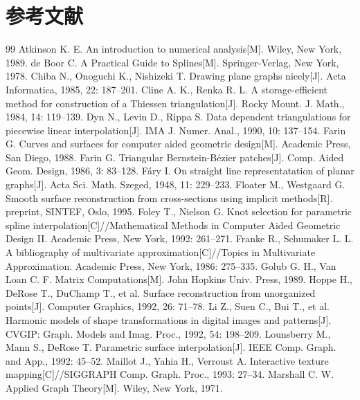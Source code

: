 \documentclass{ctexart}
\theoremstyle{proof}
\begin{document}
\section{参考文献}
\begin{thebibliography}{99}
     Atkinson K. E. An introduction to numerical analysis[M]. Wiley, New York, 1989.
     de Boor C. A Practical Guide to Splines[M]. Springer-Verlag, New York, 1978.
     Chiba N., Onoguchi K., Nishizeki T. Drawing plane graphs nicely[J]. Acta Informatica, 1985, 22: 187–201.
     Cline A. K., Renka R. L. A storage-efficient method for construction of a Thiessen triangulation[J]. Rocky Mount. J. Math., 1984, 14: 119–139.
     Dyn N., Levin D., Rippa S. Data dependent triangulations for piecewise linear interpolation[J]. IMA J. Numer. Anal., 1990, 10: 137–154.
     Farin G. Curves and surfaces for computer aided geometric design[M]. Academic Press, San Diego, 1988.
     Farin G. Triangular Bernstein-Bézier patches[J]. Comp. Aided Geom. Design, 1986, 3: 83–128.
     Fáry I. On straight line representatation of planar graphs[J]. Acta Sci. Math. Szeged, 1948, 11: 229–233.
     Floater M., Westgaard G. Smooth surface reconstruction from cross-sections using implicit methods[R]. preprint, SINTEF, Oslo, 1995.
     Foley T., Nielson G. Knot selection for parametric spline interpolation[C]//Mathematical Methods in Computer Aided Geometric Design II. Academic Press, New York, 1992: 261–271.
     Franke R., Schumaker L. L. A bibliography of multivariate approximation[C]//Topics in Multivariate Approximation. Academic Press, New York, 1986: 275–335.
     Golub G. H., Van Loan C. F. Matrix Computations[M]. John Hopkins Univ. Press, 1989.
     Hoppe H., DeRose T., DuChamp T., et al. Surface reconstruction from unorganized points[J]. Computer Graphics, 1992, 26: 71–78.
     Li Z., Suen C., Bui T., et al. Harmonic models of shape transformations in digital images and patterns[J]. CVGIP: Graph. Models and Imag. Proc., 1992, 54: 198–209.
     Lounsberry M., Mann S., DeRose T. Parametric surface interpolation[J]. IEEE Comp. Graph. and App., 1992: 45–52.
     Maillot J., Yahia H., Verroust A. Interactive texture mapping[C]//SIGGRAPH Comp. Graph. Proc., 1993: 27–34.
     Marshall C. W. Applied Graph Theory[M]. Wiley, New York, 1971.

\end{thebibliography}
\end{document}
